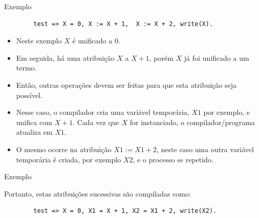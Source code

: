 \begin{frame}[fragile]
	
	\begin{exampleblock}{Exemplo}

		\begin{verbatim}
		test => X = 0, X := X + 1,  X := X + 2, write(X).
		\end{verbatim}
		\begin{itemize}
		  \item Neste exemplo $X$ é unificado a $0$. 
		  
		  \item Em seguida, há uma atribuição $X$ a $X+1$, porém $X$ já foi unificado a um termo. 
		  
		  \item Então, outras operações devem ser feitas para que esta atribuição seja
		possível.
		
   \item	Nesse caso, o compilador  cria uma variável temporária, $X1$ por exemplo, e unifica com
		$X+1$. Cada vez que $X$ for instanciado, o compilador/programa atualiza em $X1$.
		
		\item	 O mesmo ocorre na atribuição $X1 := X1 + 2$, neste caso uma outra variável temporária é criada,  por exemplo	$X2$, e o processo se repetido.
	  
		\end{itemize}
			
	\end{exampleblock}
	
\end{frame}
	
	
	
\begin{frame}[fragile]
	
	\begin{exampleblock}{Exemplo}

	
		Portanto, estas atribuições sucessivas são compiladas como:
		\pause
		\begin{verbatim}
		test => X = 0, X1 = X + 1, X2 = X1 + 2, write(X2).
		\end{verbatim} 
		
	\end{exampleblock}
	
\end{frame}




